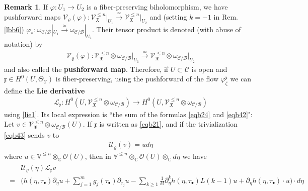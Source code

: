\documentclass[11pt,b5paper,notitlepage]{article}
\theoremstyle{definition}
\newtheorem{rem}[df]{Remark}
\theoremstyle{plain}
\newcommand{\fk}{\mathfrak}
\newcommand{\mc}{\mathcal}
\newcommand{\SV}{\mathscr{V}}
\newcommand{\xk}{\mathfrak x}
\newcommand{\blt}{\bullet}
\newcommand{\Vbb}{\mathbb V}
\newcommand{\Cbb}{\mathbb C}
\newcommand{\<}{\left\langle}
\renewcommand{\>}{\right\rangle}
\newcommand{\MC}{\mathcal{C}}
\newcommand{\fx}{\mathfrak{X}}
\numberwithin{equation}{subsection}
\begin{document}
\begin{rem}\label{lbb7}
If $\varphi:U_1\rightarrow U_2$ is a fiber-preserving biholomorphism, we have pushforward maps $\mc V_\varrho(\varphi):\SV_\fx^{\leq n}\vert_{U_1} \xrightarrow{\simeq} \SV_\fx^{\leq n}\vert_{U_2}$ and (setting $k=-1$ in Rem. \ref{lbb6}) $\varphi_*:\omega_{\mc C/\mc B}|_{U_1}\xrightarrow{\simeq}\omega_{\mc C/\mc B}|_{U_2}$. Their tensor product is denoted (with abuse of notation) by
\begin{align}
\mc V_\varrho(\varphi):\SV_\fx^{\leq n}\otimes\omega_{\mc C/\mc B}\vert_{U_1} \xrightarrow{\simeq} \SV_\fx^{\leq n}\otimes\omega_{\mc C/\mc B}\vert_{U_2}
\end{align}
and also called the \textbf{pushforward map}. Therefore, if $U\subset \mc C$ is open and $\xk\in H^0(U,\Theta_\MC)$ is fiber-preserving, using the pushforward of the flow $\varphi^\xk_\zeta$ we can define the \textbf{Lie derivative} 
\begin{align}
\mc L_\xk:H^0(U,\SV_{\fk X}^{\leq n}\otimes\omega_{\mc C/\mc B})\rightarrow H^0(U,\SV_{\fk X}^{\leq n}\otimes\omega_{\mc C/\mc B})
\end{align}
using \eqref{lie1}. Its local expression is ``the sum of the formulas \eqref{eqb24} and \eqref{eqb42}": Let $v\in\SV_{\fk X}^{\leq n}\otimes\omega_{\mc C/\mc B}(U)$. If $\xk$ is written as \eqref{eqb21}, and if the trivialization \eqref{eqb43} sends $v$ to
\begin{align*}
\mc U_\varrho(v)=ud\eta
\end{align*}
where $u\in \Vbb^{\leq n}\otimes_\Cbb\mc O(U)$, then in $\Vbb^{\leq n}\otimes_\Cbb\mc O(U)\otimes_\Cbb d\eta$ we have
\begin{align}\label{eqb44}
\begin{aligned}
&\mc U_\varrho(\eta)\mc L_\xk v\\
=&\Big(h(\eta,\tau_\blt)\partial_\eta u+\sum_{j=1}^m g_j(\tau_\blt)\partial_{\tau_j}u-\sum_{k\geq 1}\frac{1}{k!}\partial_\eta^k h(\eta,\tau_\blt)L(k-1)u+\partial_\eta h(\eta,\tau_\blt)\cdot u\Big)\cdot d\eta
\end{aligned}
\end{align}
\end{rem}
\end{document}
